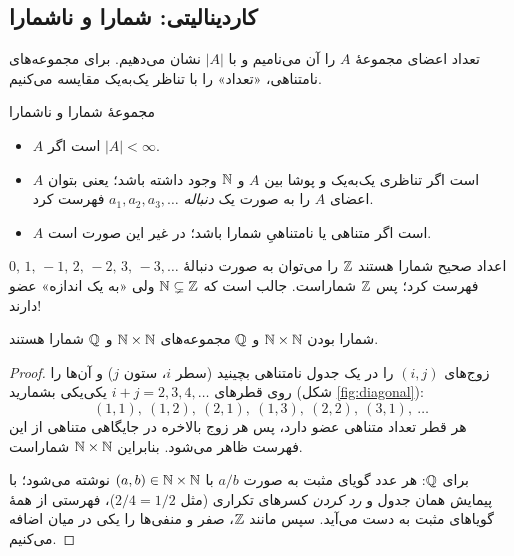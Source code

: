 \subsection{کاردینالیتی: شمارا و ناشمارا}

تعداد اعضای مجموعهٔ $A$ را  آن می‌نامیم و با $|A|$ نشان می‌دهیم. برای مجموعه‌های نامتناهی، «تعداد» را با تناظر یک‌به‌یک مقایسه می‌کنیم.

\begin{definition}{مجموعهٔ شمارا و ناشمارا}
\begin{itemize}
  \item $A$  است اگر $|A|<\infty$.
  \item $A$  است اگر تناظری یک‌به‌یک و پوشا بین $A$ و $\mathbb{N}$ وجود داشته باشد؛ یعنی بتوان اعضای $A$ را به صورت یک \emph{دنباله} $a_1,a_2,a_3,\dots$ فهرست کرد.
  \item $A$  است اگر متناهی یا نامتناهیِ شمارا باشد؛ در غیر این صورت  است.
\end{itemize}
\end{definition}

\begin{example}{اعداد صحیح شمارا هستند}
$\mathbb{Z}$ را می‌توان به صورت دنبالهٔ $0,\,1,\,-1,\,2,\,-2,\,3,\,-3,\dots$ فهرست کرد؛ پس $\mathbb{Z}$ شماراست. جالب است که $\mathbb{N}\subsetneq\mathbb{Z}$ ولی «به یک اندازه» عضو دارند!
\end{example}

\begin{theorem}[label=thm:NxN]{شمارا بودن $\mathbb{N}\times\mathbb{N}$ و $\mathbb{Q}$}
مجموعه‌های $\mathbb{N}\times\mathbb{N}$ و $\mathbb{Q}$ شمارا هستند.
\end{theorem}

\begin{proof}
زوج‌های $(i,j)$ را در یک جدول نامتناهی بچینید (سطر $i$، ستون $j$) و آن‌ها را روی قطرهای $i+j=2,3,4,\dots$ یکی‌یکی بشمارید (شکل \ref{fig:diagonal}):
\[ (1,1),\ (1,2),\ (2,1),\ (1,3),\ (2,2),\ (3,1),\ \dots \]
هر قطر تعداد متناهی عضو دارد، پس هر زوج بالاخره در جایگاهی متناهی از این فهرست ظاهر می‌شود. بنابراین $\mathbb{N}\times\mathbb{N}$ شماراست.

برای $\mathbb{Q}$: هر عدد گویای مثبت به صورت $a/b$ با $(a,b)\in\mathbb{N}\times\mathbb{N}$ نوشته می‌شود؛ با پیمایش همان جدول و \emph{رد کردن} کسرهای تکراری (مثل $2/4=1/2$)، فهرستی از همهٔ گویاهای مثبت به دست می‌آید. سپس مانند $\mathbb{Z}$، صفر و منفی‌ها را یکی در میان اضافه می‌کنیم.
\end{proof}

